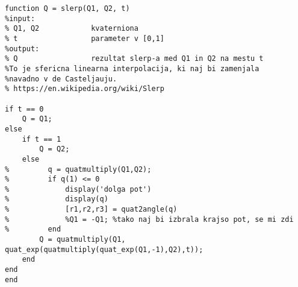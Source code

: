 \documentclass[12pt,a4paper,twoside]{article}
\theoremstyle{definition} %
\theoremstyle{plain} %
\numberwithin{equation}{section}  %
\begin{document}
\begin{lstlisting}[caption = {slerp}]
function Q = slerp(Q1, Q2, t)
%input:
% Q1, Q2            kvaterniona
% t                 parameter v [0,1]
%output:
% Q                 rezultat slerp-a med Q1 in Q2 na mestu t
%To je sfericna linearna interpolacija, ki naj bi zamenjala
%navadno v de Casteljauju.
% https://en.wikipedia.org/wiki/Slerp

if t == 0
    Q = Q1;
else
    if t == 1
        Q = Q2;
    else
%         q = quatmultiply(Q1,Q2);
%         if q(1) <= 0 
%             display('dolga pot')
%             display(q)
%             [r1,r2,r3] = quat2angle(q)
%             %Q1 = -Q1; %tako naj bi izbrala krajso pot, se mi zdi 
%         end
        Q = quatmultiply(Q1, quat_exp(quatmultiply(quat_exp(Q1,-1),Q2),t));
    end
end
end
\end{lstlisting}


\begin{lstlisting}[caption = {}]

\end{lstlisting}


\begin{lstlisting}[caption = {}]

\end{lstlisting}


\begin{lstlisting}[caption = {}]

\end{lstlisting}
\end{document}
